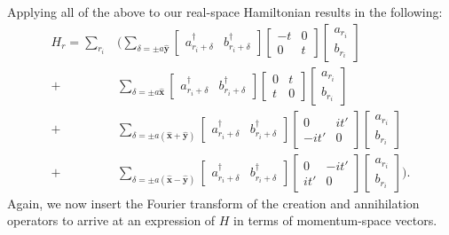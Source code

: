 \documentclass[10pt,a4paper]{article}\usepackage[]{graphicx}\usepackage[]{color}
\begin{document}
\begin{multicols}{2}
Applying all of the above to our real-space Hamiltonian results in the following:
\small
\begin{align*}
H_{r} =\sum_{r_i}&\Bigg(  \sum_{\delta = \pm a \hat{\mathbf{y}}}
\begin{bmatrix}
a^{\dagger}_{r_i+\delta} & b^{\dagger}_{r_i+\delta}
\end{bmatrix}
\begin{bmatrix}
-t & 0\\
0 & t
\end{bmatrix}
\begin{bmatrix}
a_{r_i} \\ b_{r_i}
\end{bmatrix}\\ 
+&
\sum_{\delta = \pm a \hat{\mathbf{x}}}
\begin{bmatrix}
a^{\dagger}_{r_i+\delta} & b^{\dagger}_{r_i+\delta}
\end{bmatrix}
\begin{bmatrix}
0 & t\\
t & 0
\end{bmatrix}
\begin{bmatrix}
a_{r_i} \\ b_{r_i}
\end{bmatrix}\\
+&\sum_{\delta = \pm a (\hat{\mathbf{x}}+\hat{\mathbf{y}})}
\begin{bmatrix}
a^{\dagger}_{r_i+\delta} & b^{\dagger}_{r_i+\delta}
\end{bmatrix}
\begin{bmatrix}
0 & it'\\
-it' & 0
\end{bmatrix}
\begin{bmatrix}
a_{r_i} \\ b_{r_i}
\end{bmatrix}\\
+&\sum_{\delta = \pm a (\hat{\mathbf{x}}-\hat{\mathbf{y}})}
\begin{bmatrix}
a^{\dagger}_{r_i+\delta} & b^{\dagger}_{r_i+\delta}
\end{bmatrix}
\begin{bmatrix}
0 & -it'\\
it' & 0
\end{bmatrix}
\begin{bmatrix}
a_{r_i} \\ b_{r_i}
\end{bmatrix}
\Bigg).
\end{align*}
\normalsize
Again, we now insert the Fourier transform  of the creation and annihilation operators to arrive at an expression of $H$ in terms of momentum-space vectors.\small

\end{multicols}
\end{document}
